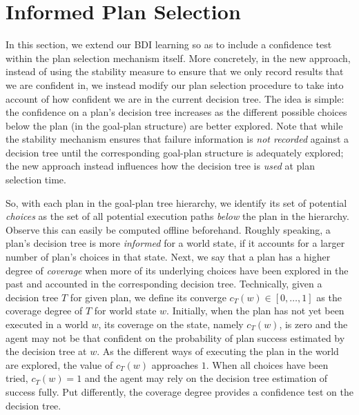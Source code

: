 \section{Informed Plan Selection}\label{sec:coverage}

In this section, we extend our BDI learning so as to include a confidence test
within the plan selection mechanism itself. More concretely, in the new approach,
instead of using the stability measure to ensure that we only record results that
we are confident in, we instead modify our plan selection procedure to take into
account of how confident we are in the current decision tree.
The idea is simple: the confidence on a plan's decision tree increases as the
different possible choices below the plan (in the goal-plan structure) are better
explored.
Note that while the stability mechanism ensures that failure information is
\emph{not recorded} against a decision tree until the corresponding goal-plan
structure is adequately explored; the new approach instead influences how the
decision tree is \emph{used} at plan selection time.


So, with each plan in the goal-plan tree hierarchy, we identify its set of
potential \textit{choices} as the set of all potential execution paths
\textit{below} the plan in the hierarchy. Observe this can easily be computed
offline beforehand.
Roughly speaking, a plan's decision tree is more \textit{informed} for a world
state, if it accounts for a larger number of plan's choices in that state.
Next, we say that a plan has a higher degree of \emph{coverage} when more of its
underlying choices have been explored in the past and accounted in the
corresponding decision tree.
Technically, given a decision tree $T$ for given plan, we define its converge
$c_T(w) \in [0,\ldots,1]$ as the coverage degree of $T$ for world state $w$.
Initially, when the plan has not yet been executed in a world $w$, its coverage
on the state, namely $c_T(w)$, is zero and the agent may not be that confident on
the probability of plan success estimated by the decision tree at $w$. As the
different ways of executing the plan in the world are explored, the value of
$c_T(w)$ approaches $1$. When all choices have been tried, $c_T(w)=1$ and the
agent may rely on the decision tree estimation of success fully.
Put differently, the coverage degree provides a confidence test on the decision
tree.




